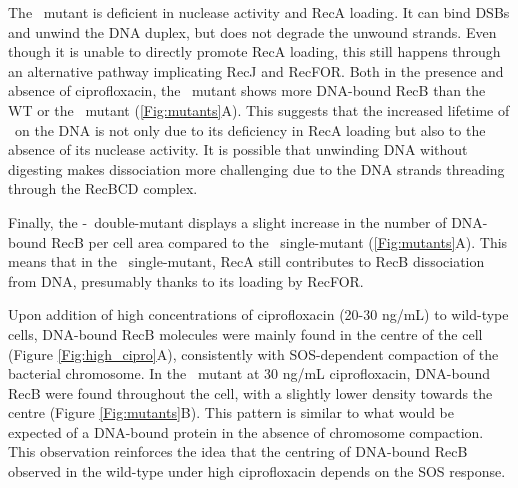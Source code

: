 The \teneighty\ mutant is deficient in nuclease activity\cite{Yu1998, Anderson1999} and RecA loading\cite{Anderson1999}. It can bind DSBs and unwind the DNA duplex, but does not degrade the unwound strands. Even though it is unable to directly promote RecA loading, this still happens through an alternative pathway implicating RecJ and RecFOR.\cite{Ivancic-Bace_2003} Both in the presence and absence of ciprofloxacin, the \teneighty\ mutant shows more DNA-bound RecB than the WT or the \dreca\ mutant (\ref{Fig:mutants}A). This suggests that the increased lifetime of \teneighty\ on the DNA is not only due to its deficiency in RecA loading but also to the absence of its nuclease activity. It is possible that unwinding DNA without digesting makes dissociation more challenging due to the DNA strands threading through the RecBCD complex.

Finally, the \dreca-\teneighty\ double-mutant displays a slight increase in the number of DNA-bound RecB per cell area compared to the \teneighty\ single-mutant (\ref{Fig:mutants}A). This means that in the \teneighty\ single-mutant, RecA still contributes to RecB dissociation from DNA, presumably thanks to its loading by RecFOR.

Upon addition of high concentrations of ciprofloxacin (20-30 ng/mL) to wild-type cells, DNA-bound RecB molecules were mainly found in the centre of the cell (Figure \ref{Fig:high_cipro}A), consistently with SOS-dependent compaction of the bacterial chromosome. In the \dreca\ mutant at 30 ng/mL ciprofloxacin, DNA-bound RecB were found throughout the cell, with a slightly lower density towards the centre (Figure \ref{Fig:mutants}B). This pattern is similar to what would be expected of a DNA-bound protein in the absence of chromosome compaction\cite{Stracy2021}. This observation reinforces the idea that the centring of DNA-bound RecB observed in the wild-type under high ciprofloxacin depends on the SOS response.


